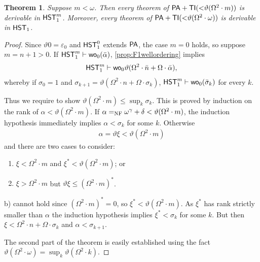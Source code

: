 \documentclass[UKenglish,cleveref,DIV=12]{scrartcl}
\newtheorem{theorem}{Theorem}[section]
\newtheorem{corollary}[lemma]{Corollary}
\theoremstyle{definition}
\theoremstyle{definition}
\begin{document}
\begin{theorem}\label{cor:F1lowerbound}\label{thm:F1lowerbound}
Suppose $m<\omega$. Then every theorem of
$\mathsf{PA}+\mathsf{TI}(\mathord<\vartheta(\Omega^2\cdot m))$  is derivable in
$\mathsf{HST}_1^{m}$. Moreover, every theorem of
$\mathsf{PA}+\mathsf{TI}(\mathord<\vartheta(\Omega^2\cdot \omega))$ is derivable in
$\mathsf{HST}_1$.
\end{theorem}
\begin{proof}
Since $\vartheta0=\varepsilon_0$ and $\mathsf{HST}_1^0$ extends $\mathsf{PA}$, the case
$m=0$ holds, so suppose $m=n+1>0$. If $\mathsf{HST}_1^m\vdash \mathsf{wo}_0(\bar\alpha)$,
\cref{prop:F1wellordering} implies
\begin{align*}
 \mathsf{HST}_1^{m}\vdash \mathsf{wo}_0 \vartheta(\Omega^2\cdot \bar n+\Omega\cdot\bar\alpha),
\end{align*}
whereby if $\sigma_0=1$ and $\sigma_{k+1}=\vartheta(\Omega^2\cdot n+\Omega\cdot\sigma_k)$, $\mathsf{HST}_1^m\vdash \mathsf{wo}_0(\bar\sigma_k)$ for every $k$.

Thus we require to show $\vartheta(\Omega^2\cdot m)\le\sup_k\sigma_k$. This
is proved by induction on the rank of $\alpha<\vartheta(\Omega^2\cdot
m)$. If $\alpha=_{\mathrm{NF}}\omega^\gamma+\delta<\vartheta(\Omega^2\cdot m)$, the induction
hypothesis immediately implies $\alpha<\sigma_k$ for some $k$. Otherwise
\begin{align*}
 \alpha=\vartheta\xi<\vartheta(\Omega^2\cdot m)
\end{align*}
and there are two cases to consider:
\begin{enumerate}%
 \item $\xi<\Omega^2\cdot m$ and $\xi^*<\vartheta(\Omega^2\cdot m)$; or
 \item $\xi>\Omega^2\cdot m$ but $\vartheta\xi\le(\Omega^2\cdot m)^*$.
\end{enumerate}
b) cannot hold since $(\Omega^2\cdot m)^*=0$, so $\xi^*<\vartheta(\Omega^2\cdot m)$. As $\xi^*$ has rank strictly
smaller than $\alpha$ the induction hypothesis
implies $\xi^*<\sigma_k$ for some $k$. But then $\xi<\Omega^2\cdot n+\Omega\cdot\sigma_k$ and
$\alpha<\sigma_{k+1}$.

The second part of the theorem is easily established using the fact $\vartheta(\Omega^2\cdot\omega)=\sup_k\vartheta(\Omega^2\cdot k)$.
\end{proof}
\end{document}
